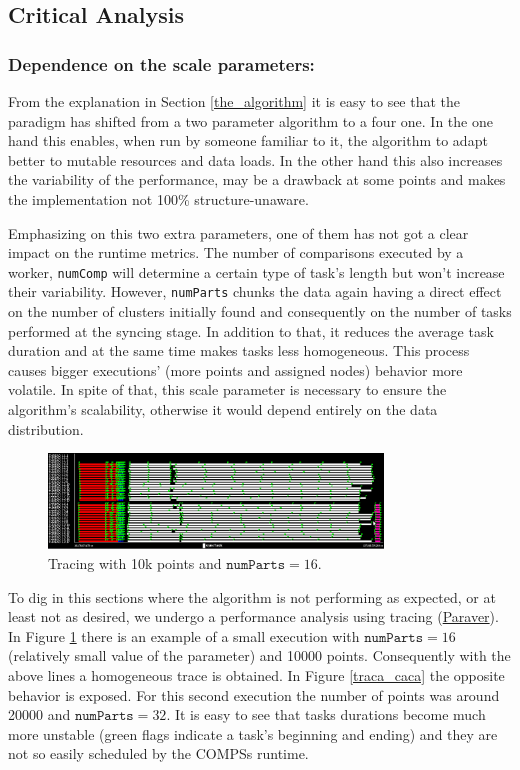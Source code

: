\documentclass[10pt,journal,compsoc]{IEEEtran}
\let\MYoriglatexcaption\caption
\renewcommand{\caption}[2][\relax]{\MYoriglatexcaption[#2]{#2}}
\begin{document}
\subsection{Critical Analysis} \label{subsec:critical}

\subsubsection{Dependence on the scale parameters:}

From the explanation in Section \ref{the_algorithm} it is easy to see that the paradigm has shifted from a two parameter algorithm to a four one. In the one hand this enables, when run by someone familiar to it, the algorithm to adapt better to mutable resources and data loads. In the other hand this also increases the variability of the performance, may be a drawback at some points and makes the implementation not 100\% structure-unaware.

Emphasizing on this two extra parameters, one of them has not got a clear impact on the runtime metrics. The number of comparisons executed by a worker, \texttt{numComp} will determine a certain type of task's length but won't increase their variability. However, \texttt{numParts} chunks the data again having a direct effect on the number of clusters initially found and consequently on the number of tasks performed at the syncing stage. In addition to that, it reduces the average task duration and at the same time makes tasks less homogeneous. This process causes bigger executions' (more points and assigned nodes) behavior more volatile. In spite of that, this scale parameter is necessary to ensure the algorithm's scalability, otherwise it would depend entirely on the data distribution.

\begin{figure}[!h]
\centering
\includegraphics[width=3.5in]{img/traca_compacte.png}
\caption{Tracing with 10k points and $\texttt{numParts}=16$.}
\label{traca_bona}
\end{figure}

To dig in this sections where the algorithm is not performing as expected, or at least not as desired, we undergo a performance analysis using tracing (\href{https://tools.bsc.es/paraver}{Paraver}). In Figure \ref{traca_bona} there is an example of a small execution with  $\texttt{numParts}=16$ (relatively small value of the parameter) and 10000 points. Consequently with the above lines a homogeneous trace is obtained. In Figure \ref{traca_caca} the opposite behavior is exposed. For this second execution the number of points was around 20000 and $\texttt{numParts}=32$. It is easy to see that tasks durations become much more unstable (green flags indicate a task's beginning and ending) and they are not so easily scheduled by the COMPSs runtime.
\end{document}
